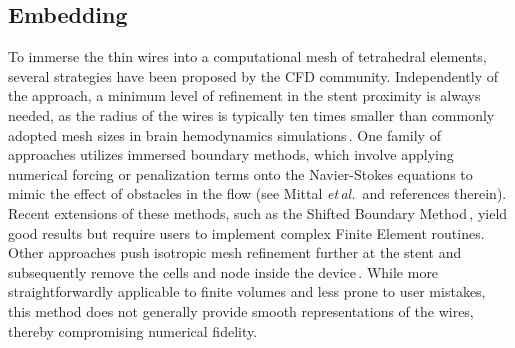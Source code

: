 \subsection{Embedding}
To immerse the thin wires into a computational mesh of tetrahedral elements, several strategies have been proposed by the CFD community. Independently of the approach, a minimum level of refinement in the stent proximity is always needed, as the radius of the wires is typically ten times smaller than commonly adopted mesh sizes in brain hemodynamics simulations\,\cite{Jeken-Rico2023, Cebral2011, Berg2016}. One family of approaches utilizes immersed boundary methods, which involve applying numerical forcing or penalization terms onto the Navier-Stokes equations to mimic the effect of obstacles in the flow (see Mittal \textit{et\,al.}\,\cite{Mittal2005} and references therein). Recent extensions of these methods, such as the Shifted Boundary Method\,\cite{Main2018}, yield good results but require users to implement complex Finite Element routines. Other approaches push isotropic mesh refinement further at the stent and subsequently remove the cells and node inside the device\,\cite{Cebral2005}. While more straightforwardly applicable to finite volumes and less prone to user mistakes, this method does not generally provide smooth representations of the wires, thereby compromising numerical fidelity.

